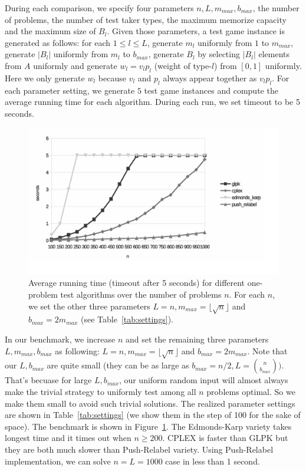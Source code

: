 \documentclass{article}
\begin{document}
During each comparison, we specify four parameters $n, L, m_{max}, b_{max}$,
the number of problems, the number of test taker types, the maximum memorize
capacity and the maximum size of $B_l$. Given those parameters, a test game
instance is generated as follows: for each $1 \leq l \leq L$, generate $m_l$
uniformly from $1$ to $m_{max}$, generate $|B_l|$ uniformly from $m_l$ to
$b_{max}$, generate $B_l$ by selecting $|B_l|$ elements from $A$ uniformly and
generate $w_l = v_l p_l$ (weight of type-$l$) from $[0,1]$ uniformly. Here we
only generate $w_l$ because $v_l$ and $p_l$ always appear together as $v_l
p_l$. For each parameter setting, we generate $5$ test game instances and
compute the average running time for each algorithm. During each run, we set
timeout to be 5 seconds. 

\begin{figure}
	\caption{Average running time (timeout after 5 seconds) for different
	one-problem test algorithms over the number of problems $n$. For each
	$n$, we set the other three parameters $L = n, m_{max} = \lfloor
	\sqrt{n} \rfloor$ and $b_{max} = 2m_{max}$ (see
	Table~\ref{tab:settings}).}
	\label{fig:benchmark}
	\includegraphics[trim=5mm 0 15mm 0, clip, width=\linewidth]{benchmark}
\end{figure}

In our benchmark, we increase $n$ and set the remaining three parameters $L,
m_{max}, b_{max}$ as following: $L = n, m_{max} = \lfloor \sqrt{n} \rfloor$ and
$b_{max} = 2m_{max}$. Note that our $L, b_{max}$ are quite small (they can be
as large as $b_{max} = n/2, L = \binom{n}{b_{max}})$. That's becuase for large $L,
b_{max}$, our uniform random input will almost always make the trivial strategy
to uniformly test among all $n$ problems optimal. So we make them small to
avoid such trivial solutions. The realized parameter settings are shown in
Table~\ref{tab:settings} (we show them in the step of 100 for the sake of
space). The benchmark is shown in Figure~\ref{fig:benchmark}. The Edmonds-Karp
variety takes longest time and it times out when $n \geq 200$. CPLEX is faster
than GLPK but they are both much slower than Push-Relabel variety. Using
Push-Relabel implementation, we can solve $n=L=1000$ case in less than 1 second.
\end{document}

